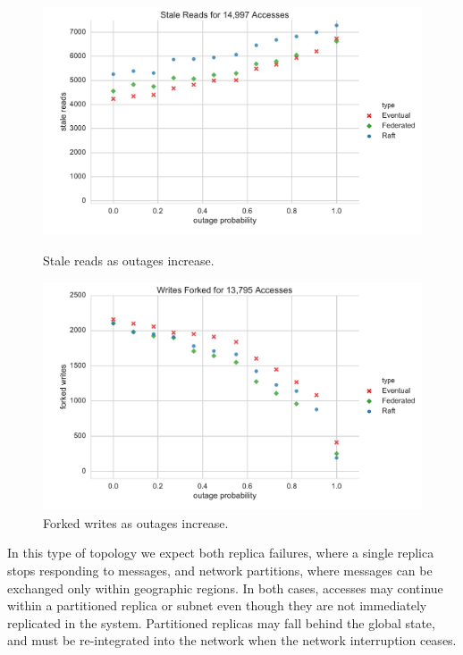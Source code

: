 \documentclass[10pt,conference,letterpaper]{IEEEtran}
\begin{document}
\begin{figure}[t]
    \centering
      \includegraphics[width=\linewidth]{figures/outages/stale_reads}
      \caption{Stale reads as outages increase.}\label{fig:outages_stale_reads}
    \endminipage
      \includegraphics[width=\linewidth]{figures/outages/forked_writes}
      \caption{Forked writes as outages increase.}\label{fig:outages_forked_writes}
    \endminipage\hfill
\end{figure}

In this type of topology we expect both replica failures, where a single
replica stops responding to messages, and network partitions, where messages
can be exchanged only within geographic regions.
In both cases, accesses may continue within a partitioned replica or subnet
even though they are not immediately replicated in the system.
Partitioned replicas may fall behind the global state, and must be
re-integrated into the network when the network interruption ceases.
\end{document}
